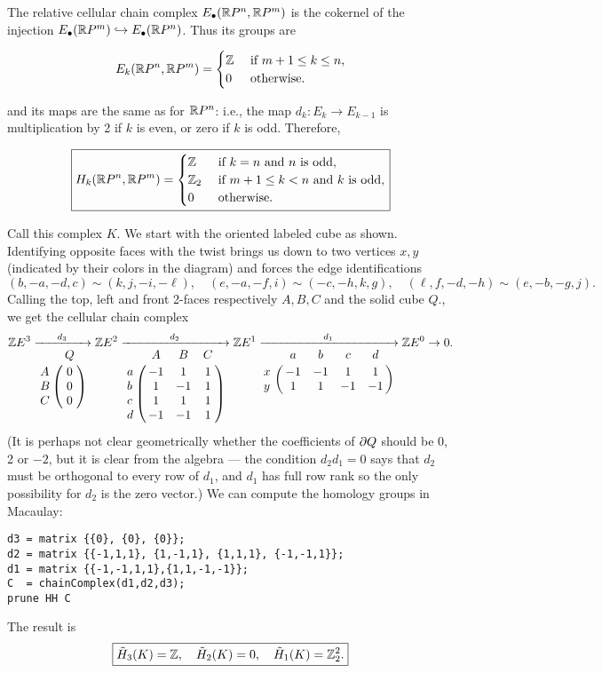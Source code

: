 
\soln The relative cellular chain complex $E_\bullet(\mathbb{R} P^n,\mathbb{R} P^m)$ is the cokernel of the injection $E_\bullet(\mathbb{R} P^m)\hookrightarrow E_\bullet(\mathbb{R} P^n)$.  Thus its groups are

\[E_k(\mathbb{R} P^n,\mathbb{R} P^m) = \begin{cases} \mathbb{Z} & \text{ if } m+1\leq k\leq n,\\ 0 & \text{ otherwise.} \end{cases}\]

and its maps are the same as for $\mathbb{R} P^n$: i.e., the map $d_k:E_k\to E_{k-1}$ is multiplication by 2 if $k$ is even, or zero if $k$ is odd.  Therefore,

\[\boxed{H_k(\mathbb{R} P^n,\mathbb{R} P^m) = \begin{cases}
\mathbb{Z} & \text{ if $k=n$ and $n$ is odd,} \\
\mathbb{Z}_2 & \text{ if $m+1\leq k<n$ and $k$ is odd,}\\
0 & \text{ otherwise.}
\end{cases}}\]


\soln
Call this complex $K$.  We start with the oriented labeled cube as shown.
Identifying opposite faces with the twist brings us down to two vertices $x,y$ (indicated by their colors in the diagram) and forces the edge identifications
\[(b,-a,-d,c)\sim(k,j,-i,-\ell),\quad (e,-a,-f,i)\sim(-c,-h,k,g),\quad (\ell,f,-d,-h)\sim(e,-b,-g,j).\]
Calling the top, left and front 2-faces respectively $A,B,C$ and the solid cube $Q$., we get the cellular chain complex
\[
\Zz E^3\xrightarrow[\bordermatrix{&Q\cr A&0\cr B&0\cr C&0\cr}]{d_3}
\Zz E^2\xrightarrow[\bordermatrix{&A&B&C\cr
a&-1&1&1\cr
b&1&-1&1\cr
c&1&1&1\cr
d&-1&-1&1}]{d_2}
\Zz E^1\xrightarrow[\bordermatrix{&a&b&c&d\cr 
x&-1&-1&1&1\cr y&1&1&-1&-1}]{d_1}
\Zz E^0 \to 0.
\]
(It is perhaps not clear geometrically whether the coefficients of $\partial Q$ should be 0, 2 or $-2$, but it is clear from the algebra --- the condition $d_2d_1=0$ says that $d_2$ must be orthogonal to every row of $d_1$, and $d_1$ has full row rank so the only possibility for $d_2$ is the zero vector.)  We can compute the homology groups in Macaulay:
\begin{verbatim}
d3 = matrix {{0}, {0}, {0}};
d2 = matrix {{-1,1,1}, {1,-1,1}, {1,1,1}, {-1,-1,1}};
d1 = matrix {{-1,-1,1,1},{1,1,-1,-1}};
C  = chainComplex(d1,d2,d3);
prune HH C
\end{verbatim}
The result is
\[\boxed{\tilde H_3(K)=\mathbb{Z}, \quad \tilde H_2(K)=0, \quad \tilde H_1(K)=\mathbb{Z}_2^2.}\]

